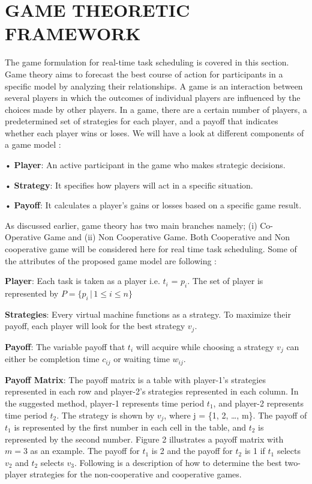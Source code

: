 \documentclass[conference]{IEEEtran}
\begin{document}
\bigskip
\section{\textbf{ GAME THEORETIC FRAMEWORK}}
The game formulation for real-time task scheduling is covered in this section. Game theory aims to forecast the best course of action for participants in a specific model by analyzing their relationships. A game is an interaction between several players in which the outcomes of individual players are influenced by the choices made by other players. In a game, there are a certain number of players, a predetermined set of strategies for each player, and a payoff that indicates whether each player wins or loses. We will have a look at different components of a game model :

• \textbf{Player}: An active participant in the game who makes strategic decisions.

• \textbf{Strategy}: It specifies how players will act in a specific situation.

• \textbf{Payoff}: It calculates a player's gains or losses based on a specific game result.

As discussed earlier, game theory has two main branches namely; (i) Co-Operative Game and (ii) Non Cooperative Game.
Both Cooperative and Non cooperative game will be considered here for real time task scheduling. Some of the attributes of the proposed game model are following :

\textbf{Player}: Each task is taken as a player i.e. $t_{i}$ = $p_{i}$. The set of player is represented by
$P = \{p_i \,|\, 1 \leq i \leq n\}$

\textbf{Strategies}: Every virtual machine functions as a strategy. To maximize their payoff, each player will look for the best strategy $v_{j}$.

\textbf{Payoff}: The variable payoff that $t_{i}$ will acquire while choosing a strategy $v_{j}$ can either be completion time $c_{ij}$ or waiting time $w_{ij}$.

\textbf{Payoff Matrix}: The payoff matrix is a table with player-1's strategies represented in each row and player-2's strategies represented in each column. In the suggested method, player-1 represents time period $t_{1}$, and player-2 represents time period $t_{2}$. The strategy is shown by $v_{j}$, where j = \{1, 2, \ldots, m\}.
The payoff of $t_{1}$ is represented by the first number in each cell in the table, and $t_{2}$ is represented by the second number. Figure 2 illustrates a payoff matrix with $m = 3$ as an example. The payoff for $t_{1}$ is 2 and the payoff for $t_{2}$ is 1 if $t_{1}$ selects $v_{2}$ and $t_{2}$ selects $v_{3}$.
Following is a description of how to determine the best two-player strategies for the non-cooperative and cooperative games.
\end{document}
